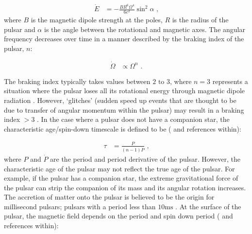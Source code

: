 \begin{equation}
    \begin{aligned}
    \dot{E}&=-\frac{BR^6\Omega^4}{6c^2}\sin^2\alpha\text{ ,}
    \end{aligned}
\end{equation}
where $B$ is the magnetic dipole strength at the poles, $R$ is the radius of the pulsar and $\alpha$ is the angle between the rotational and magnetic axes. The angular frequency decreases over time in a manner described by the braking index of the pulsar, $n$:

\begin{equation}
    \begin{aligned}
    \dot{\Omega} &\propto \Omega^n\text{ .}
    \end{aligned}
\end{equation}

The braking index typically takes values between $2\text{ to }3$, where $n=3$ represents a situation where the pulsar loses all its rotational energy through magnetic dipole radiation \citep{2007Ap&SS.308..317L}. However, `glitches' (sudden speed up events that are thought to be due to transfer of angular momentum within the pulsar) may result in a braking index $>3$ \citep{2019MNRAS.489.3810P,2020MNRAS.494.2012P}. In the case where a pulsar does not have a companion star, the characteristic age/spin-down timescale is defined to be (\cite{2007ASSL..326.....H} and references within):

\begin{equation}
    \begin{aligned}
    \tau&=\frac{P}{(n-1)\dot{P}} \text{ ,}
    \end{aligned} \label{eq:chapter1_characteristic_age}
\end{equation}
\noindent where $P$ and $\dot{P}$ are the period and period derivative of the pulsar. However, the characteristic age of the pulsar may not reflect the true age of the pulsar. For example, if the pulsar has a companion star, the extreme gravitational force of the pulsar can strip the companion of its mass and its angular rotation increases. The accretion of matter onto the pulsar is believed to be the origin for millisecond pulsars; pulsars with a period less than $10\si{\milli\second}$ \citep{1982Natur.300..728A}.
\newpar
At the surface of the pulsar, the magnetic field depends on the period and spin down period (\cite{2012hpa..book.....L} and references within):

